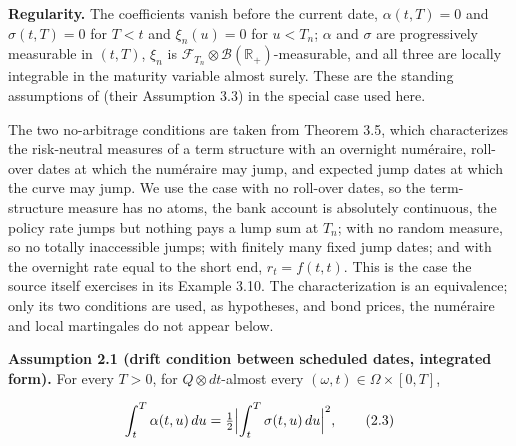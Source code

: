 \documentclass[11pt]{article}
\begin{document}
\textbf{Regularity.} The coefficients vanish before the current date, \(\alpha(t, T) = 0\) and \(\sigma(t, T) = 0\) for \(T < t\) and \(\xi_n(u) = 0\) for \(u < T_n\); \(\alpha\) and \(\sigma\) are progressively measurable in \((t, T)\), \(\xi_n\) is \(\mathcal F_{T_n} \otimes \mathcal B(\mathbb R_+)\)-measurable, and all three are locally integrable in the maturity variable almost surely. These are the standing assumptions of \cite{fontana2022term} (their Assumption 3.3) in the special case used here.

The two no-arbitrage conditions are taken from \cite{fontana2022term} Theorem 3.5, which characterizes the risk-neutral measures of a term structure with an overnight numéraire, roll-over dates at which the numéraire may jump, and expected jump dates at which the curve may jump. We use the case with no roll-over dates, so the term-structure measure has no atoms, the bank account is absolutely continuous, the policy rate jumps but nothing pays a lump sum at \(T_n\); with no random measure, so no totally inaccessible jumps; with finitely many fixed jump dates; and with the overnight rate equal to the short end, \(r_t = f(t, t)\). This is the case the source itself exercises in its Example 3.10. The characterization is an equivalence; only its two conditions are used, as hypotheses, and bond prices, the numéraire and local martingales do not appear below.

\textbf{Assumption 2.1 (drift condition between scheduled dates, integrated form).} For every \(T > 0\), for \(Q \otimes dt\)-almost every \((\omega, t) \in \Omega \times [0, T]\),

\begin{equation*}
\int_t^T \alpha(t, u)\,du = \tfrac12 \Bigl| \int_t^T \sigma(t, u)\,du \Bigr|^2, \tag{2.3}\label{eq:2.3}
\end{equation*}
\end{document}

